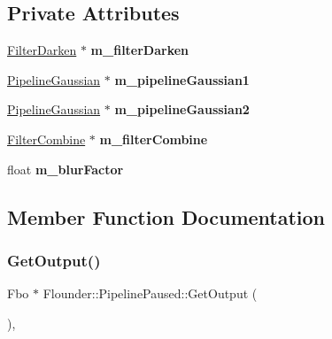\subsection*{Private Attributes}
\begin{DoxyCompactItemize}
\item 
\mbox{\label{class_flounder_1_1_pipeline_paused_a5e06a186203dd37e63ae14d9d46bcf59}} 
\hyperlink{class_flounder_1_1_filter_darken}{Filter\+Darken} $\ast$ {\bfseries m\+\_\+filter\+Darken}
\item 
\mbox{\label{class_flounder_1_1_pipeline_paused_aadbb626cadad00a525a402479af7191c}} 
\hyperlink{class_flounder_1_1_pipeline_gaussian}{Pipeline\+Gaussian} $\ast$ {\bfseries m\+\_\+pipeline\+Gaussian1}
\item 
\mbox{\label{class_flounder_1_1_pipeline_paused_a4b3004b87bb42bc1dd288c48885f9667}} 
\hyperlink{class_flounder_1_1_pipeline_gaussian}{Pipeline\+Gaussian} $\ast$ {\bfseries m\+\_\+pipeline\+Gaussian2}
\item 
\mbox{\label{class_flounder_1_1_pipeline_paused_a88e213fcefc9c07d13fb13c69ac8e034}} 
\hyperlink{class_flounder_1_1_filter_combine}{Filter\+Combine} $\ast$ {\bfseries m\+\_\+filter\+Combine}
\item 
\mbox{\label{class_flounder_1_1_pipeline_paused_a6a75b93ae1e4994630036d2bbe5a6ba5}} 
float {\bfseries m\+\_\+blur\+Factor}
\end{DoxyCompactItemize}


\subsection{Member Function Documentation}
\mbox{\label{class_flounder_1_1_pipeline_paused_aec5ab7753183681ed2d97d9f6b4781ef}} 
\subsubsection{\texorpdfstring{Get\+Output()}{GetOutput()}}
{\footnotesize\ttfamily Fbo $\ast$ Flounder\+::\+Pipeline\+Paused\+::\+Get\+Output (\begin{DoxyParamCaption}{ }\end{DoxyParamCaption})\hspace{0.3cm}{\ttfamily [override]}, {\ttfamily [virtual]}}



